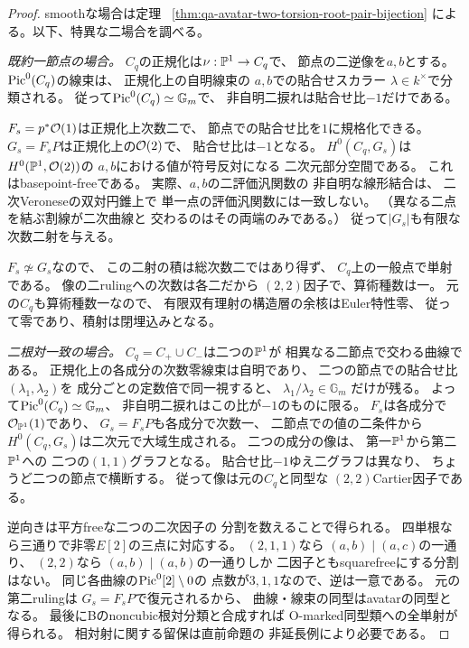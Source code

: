 \begin{proof}
smoothな場合は定理
~\ref{thm:qa-avatar-two-torsion-root-pair-bijection}
による。以下、特異な二場合を調べる。

\emph{既約一節点の場合。}
$C_q$の正規化は$\nu:\mathbb P^1\to C_q$で、
節点の二逆像を$a,b$とする。
$\operatorname{Pic}^0(C_q)$の線束は、
正規化上の自明線束の
$a,b$での貼合せスカラー
$\lambda\in k^\times$で分類される。
従って$\operatorname{Pic}^0(C_q)\simeq\mathbb G_m$で、
非自明二捩れは貼合せ比$-1$だけである。

$F_s=p^*\mathcal O(1)$は正規化上次数二で、
節点での貼合せ比を$1$に規格化できる。
$G_s=F_sP$は正規化上の$\mathcal O(2)$で、
貼合せ比は$-1$となる。
$H^0(C_q,G_s)$は$H^0(\mathbb P^1,\mathcal O(2))$の
$a,b$における値が符号反対になる
二次元部分空間である。
これはbasepoint-freeである。
実際、$a,b$の二評価汎関数の
非自明な線形結合は、
二次Veroneseの双対円錐上で
単一点の評価汎関数には一致しない。
（異なる二点を結ぶ割線が二次曲線と
交わるのはその両端のみである。）
従って$|G_s|$も有限な次数二射を与える。

$F_s\not\simeq G_s$なので、
この二射の積は総次数二ではあり得ず、
$C_q$上の一般点で単射である。
像の二rulingへの次数は各二だから
$(2,2)$因子で、算術種数は一。
元の$C_q$も算術種数一なので、
有限双有理射の構造層の余核はEuler特性零、
従って零であり、積射は閉埋込みとなる。

\emph{二根対一致の場合。}
$C_q=C_+\cup C_-$は二つの$\mathbb P^1$が
相異なる二節点で交わる曲線である。
正規化上の各成分の次数零線束は自明であり、
二つの節点での貼合せ比
$(\lambda_1,\lambda_2)$を
成分ごとの定数倍で同一視すると、
$\lambda_1/\lambda_2\in\mathbb G_m$
だけが残る。
よって$\operatorname{Pic}^0(C_q)\simeq\mathbb G_m$、
非自明二捩れはこの比が$-1$のものに限る。
$F_s$は各成分で$\mathcal O_{\mathbb P^1}(1)$であり、
$G_s=F_sP$も各成分で次数一、
二節点での値の二条件から
$H^0(C_q,G_s)$は二次元で大域生成される。
二つの成分の像は、
第一$\mathbb P^1$から第二$\mathbb P^1$への
二つの$(1,1)$グラフとなる。
貼合せ比$-1$ゆえ二グラフは異なり、
ちょうど二つの節点で横断する。
従って像は元の$C_q$と同型な
$(2,2)$Cartier因子である。

逆向きは平方freeな二つの二次因子の
分割を数えることで得られる。
四単根なら三通りで非零$E[2]$の三点に対応する。
$(2,1,1)$なら
$(a,b)\mid(a,c)$の一通り、
$(2,2)$なら
$(a,b)\mid(a,b)$の一通りしか
二因子ともsquarefreeにする分割はない。
同じ各曲線の$\operatorname{Pic}^0[2]\setminus0$の
点数が$3,1,1$なので、逆は一意である。
元の第二rulingは
$G_s=F_sP$で復元されるから、
曲線・線束の同型はavatarの同型となる。
最後にBのnoncubic根対分類と合成すれば
O-marked同型類への全単射が得られる。
相対射に関する留保は直前命題の
非延長例により必要である。
\end{proof}

